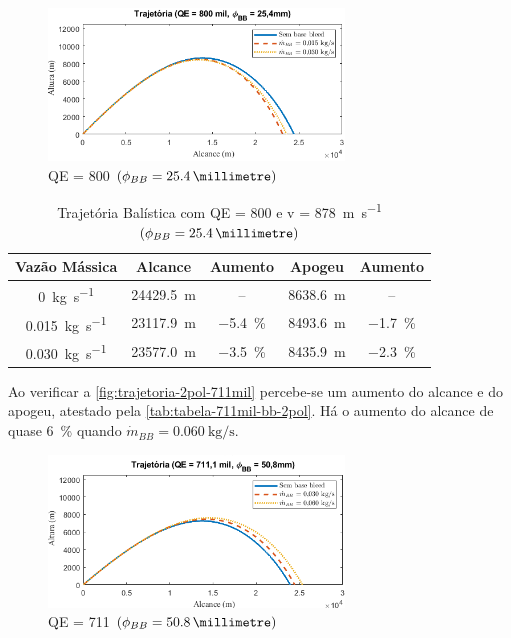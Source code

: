 \begin{figure}[!ht]
	\centering
    \includegraphics[width=0.7\textwidth]{foto2-qe800mil-1pol.png}
    \caption[QE = \qty{800}{\milliradian} \(\left(\phi_{BB} = \qty{25,4}{\millimetre}\right)\)]{QE = \qty{800}{\milliradian} \(\left(\phi_{BB} = \qty{25,4}{\millimetre}\right)\)}
    \label{fig:trajetoria-1pol-800mil}
\end{figure}

\begin{table}[ht]
\centering
\caption[Trajetória Balística com QE = \qty{800}{\milliradian} e v = \qty{878}{\metre\per\second} \(\left(\phi_{BB} = \qty{25,4}{\millimetre}\right)\)]{Trajetória Balística com QE = \qty{800}{\milliradian} e v = \qty{878}{\metre\per\second} \(\left(\phi_{BB} = \qty{25,4}{\millimetre}\right)\)}
\vspace{0.5cm}
\begin{tabular}{c|c|c|c|c}
Vazão Mássica & Alcance & Aumento & Apogeu & Aumento \\
\hline
\qty{0}{\kilogram\per\second} & \qty{24429,5}{\metre} & -- & \qty{8638,6}{\metre} & -- \\ 
\qty{0,015}{\kilogram\per\second} & \qty{23117,9}{\metre} & \qty{-5,4}{\percent} & \qty{8493,6}{\metre} & \qty{-1,7}{\percent} \\
\qty{0,030}{\kilogram\per\second} & \qty{23577,0}{\metre} & \qty{-3,5}{\percent} & \qty{8435,9}{\metre} & \qty{-2,3}{\percent}
\end{tabular}
\label{tab:tabela-800mil-bb-1pol}
\end{table}

Ao verificar a \autoref{fig:trajetoria-2pol-711mil} percebe-se um aumento do alcance e do apogeu, atestado pela \autoref{tab:tabela-711mil-bb-2pol}. Há o aumento do alcance de quase \qty{6}{\percent} quando \(\Dot{m}_{BB} = \qty{0,060}{\kilogram\per\second}\).

\begin{figure}[!ht]
	\centering
    \includegraphics[width=0.7\textwidth]{foto3-qe711mil-2pol.png}
    \caption[QE = \qty{711}{\milliradian} \(\left(\phi_{BB} = \qty{50,8}{\millimetre}\right)\)]{QE = \qty{711}{\milliradian} \(\left(\phi_{BB} = \qty{50,8}{\millimetre}\right)\)}
    \label{fig:trajetoria-2pol-711mil}
\end{figure}

